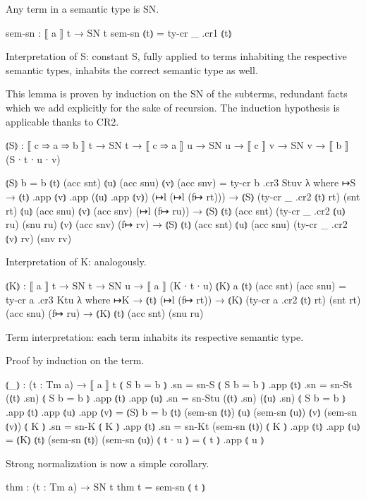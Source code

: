 Any term in a semantic type is SN.

\begin{code}
sem-sn : ⟦ a ⟧ t → SN t
sem-sn ⦅t⦆ = ty-cr _ .cr1 ⦅t⦆
\end{code}

Interpretation of S:
constant S, fully applied to terms inhabiting the respective semantic types,
inhabits the correct semantic type as well.

This lemma is proven by induction on the SN of the subterms,
redundant facts which we add explicitly for the sake of recursion.
The induction hypothesis is applicable thanks to CR2.

\begin{code}
⦅S⦆  :  ⟦ c ⇒ a ⇒ b ⟧ t  → SN t
     →  ⟦ c ⇒ a ⟧ u      → SN u
     →  ⟦ c ⟧ v          → SN v
     →  ⟦ b ⟧ (S ∙ t ∙ u ∙ v)

⦅S⦆ {b = b} ⦅t⦆ (acc snt) ⦅u⦆ (acc snu) ⦅v⦆ (acc snv) = ty-cr b .cr3 Stuv λ where
  ↦S                 → ⦅t⦆ .app ⦅v⦆ .app (⦅u⦆ .app ⦅v⦆)
  (↦l (↦l (f↦ rt)))  → ⦅S⦆  (ty-cr _ .cr2 ⦅t⦆ rt) (snt rt)
                            ⦅u⦆ (acc snu)
                            ⦅v⦆ (acc snv)
  (↦l (f↦ ru))       → ⦅S⦆  ⦅t⦆ (acc snt)
                            (ty-cr _ .cr2 ⦅u⦆ ru) (snu ru)
                            ⦅v⦆ (acc snv)
  (f↦ rv)            → ⦅S⦆  ⦅t⦆ (acc snt)
                            ⦅u⦆ (acc snu)
                            (ty-cr _ .cr2 ⦅v⦆ rv) (snv rv)
\end{code}

Interpretation of K: analogously.

\begin{code}
⦅K⦆ : ⟦ a ⟧ t → SN t → SN u → ⟦ a ⟧ (K ∙ t ∙ u)
⦅K⦆ {a} ⦅t⦆ (acc snt) (acc snu) = ty-cr a .cr3 Ktu λ where
  ↦K            → ⦅t⦆
  (↦l (f↦ rt))  → ⦅K⦆ (ty-cr a .cr2 ⦅t⦆ rt) (snt rt) (acc snu)
  (f↦ ru)       → ⦅K⦆ ⦅t⦆ (acc snt) (snu ru)
\end{code}

Term interpretation: each term inhabits its respective semantic type.

Proof by induction on the term.

\begin{code}
⦅_⦆ : (t : Tm a) → ⟦ a ⟧ t
⦅ S {b = b} ⦆ .sn                         = sn-S
⦅ S {b = b} ⦆ .app ⦅t⦆ .sn                = sn-St  (⦅t⦆ .sn)
⦅ S {b = b} ⦆ .app ⦅t⦆ .app ⦅u⦆ .sn       = sn-Stu (⦅t⦆ .sn) (⦅u⦆ .sn)
⦅ S {b = b} ⦆ .app ⦅t⦆ .app ⦅u⦆ .app ⦅v⦆  = ⦅S⦆ {b = b}  ⦅t⦆ (sem-sn ⦅t⦆)
                                                         ⦅u⦆ (sem-sn ⦅u⦆)
                                                         ⦅v⦆ (sem-sn ⦅v⦆)
⦅ K ⦆ .sn                                 = sn-K
⦅ K ⦆ .app ⦅t⦆ .sn                        = sn-Kt (sem-sn ⦅t⦆)
⦅ K ⦆ .app ⦅t⦆ .app ⦅u⦆                   = ⦅K⦆ ⦅t⦆ (sem-sn ⦅t⦆) (sem-sn ⦅u⦆)
⦅ t ∙ u ⦆                                 = ⦅ t ⦆ .app ⦅ u ⦆
\end{code}

Strong normalization is now a simple corollary.

\begin{code}
thm : (t : Tm a) → SN t
thm t = sem-sn ⦅ t ⦆
\end{code}


